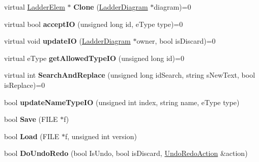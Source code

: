 \begin{DoxyCompactItemize}
\item 
\hypertarget{class_ladder_elem_a303166a93d0cae8a9b3a6b418cd4b3f0}{virtual \hyperlink{class_ladder_elem}{Ladder\-Elem} $\ast$ {\bfseries Clone} (\hyperlink{class_ladder_diagram}{Ladder\-Diagram} $\ast$diagram)=0}\label{class_ladder_elem_a303166a93d0cae8a9b3a6b418cd4b3f0}

\item 
\hypertarget{class_ladder_elem_ad2a5f2906ca4545d61c59aaa5bbb8532}{virtual bool {\bfseries accept\-I\-O} (unsigned long id, e\-Type type)=0}\label{class_ladder_elem_ad2a5f2906ca4545d61c59aaa5bbb8532}

\item 
\hypertarget{class_ladder_elem_af4cd0b1d17797fff4ac6d3c6ffa7f1fa}{virtual void {\bfseries update\-I\-O} (\hyperlink{class_ladder_diagram}{Ladder\-Diagram} $\ast$owner, bool is\-Discard)=0}\label{class_ladder_elem_af4cd0b1d17797fff4ac6d3c6ffa7f1fa}

\item 
\hypertarget{class_ladder_elem_a582660df6d2ca86b3da1850bd1b0b0b8}{virtual e\-Type {\bfseries get\-Allowed\-Type\-I\-O} (unsigned long id)=0}\label{class_ladder_elem_a582660df6d2ca86b3da1850bd1b0b0b8}

\item 
\hypertarget{class_ladder_elem_a87d5a1f182ec0907ce83f43bbb1fa836}{virtual int {\bfseries Search\-And\-Replace} (unsigned long id\-Search, string s\-New\-Text, bool is\-Replace)=0}\label{class_ladder_elem_a87d5a1f182ec0907ce83f43bbb1fa836}

\item 
\hypertarget{class_ladder_elem_aacbd85d07d925941a6c142ca06c42c8c}{bool {\bfseries update\-Name\-Type\-I\-O} (unsigned int index, string name, e\-Type type)}\label{class_ladder_elem_aacbd85d07d925941a6c142ca06c42c8c}

\item 
\hypertarget{class_ladder_elem_a23ddcab7515c6686f8e6cd3f7698030e}{bool {\bfseries Save} (F\-I\-L\-E $\ast$f)}\label{class_ladder_elem_a23ddcab7515c6686f8e6cd3f7698030e}

\item 
\hypertarget{class_ladder_elem_ae4be9df611a11ca978661b00af35117b}{bool {\bfseries Load} (F\-I\-L\-E $\ast$f, unsigned int version)}\label{class_ladder_elem_ae4be9df611a11ca978661b00af35117b}

\item 
\hypertarget{class_ladder_elem_a0c71aa34ef6e51563b06900853e0e8ac}{bool {\bfseries Do\-Undo\-Redo} (bool Is\-Undo, bool is\-Discard, \hyperlink{struct_undo_redo_action}{Undo\-Redo\-Action} \&action)}\label{class_ladder_elem_a0c71aa34ef6e51563b06900853e0e8ac}

\end{DoxyCompactItemize}
